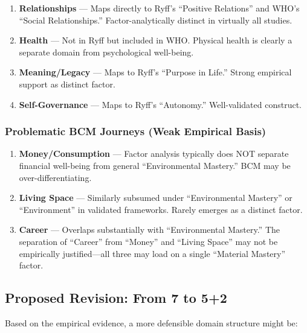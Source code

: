 \begin{enumerate}
\item \textbf{Relationships} --- Maps directly to Ryff's ``Positive Relations'' and WHO's ``Social Relationships.'' Factor-analytically distinct in virtually all studies.

\item \textbf{Health} --- Not in Ryff but included in WHO. Physical health is clearly a separate domain from psychological well-being.

\item \textbf{Meaning/Legacy} --- Maps to Ryff's ``Purpose in Life.'' Strong empirical support as distinct factor.

\item \textbf{Self-Governance} --- Maps to Ryff's ``Autonomy.'' Well-validated construct.
\end{enumerate}

\subsubsection{Problematic BCM Journeys (Weak Empirical Basis)}

\begin{enumerate}
\item \textbf{Money/Consumption} --- Factor analysis typically does NOT separate financial well-being from general ``Environmental Mastery.'' BCM may be over-differentiating.

\item \textbf{Living Space} --- Similarly subsumed under ``Environmental Mastery'' or ``Environment'' in validated frameworks. Rarely emerges as a distinct factor.

\item \textbf{Career} --- Overlaps substantially with ``Environmental Mastery.'' The separation of ``Career'' from ``Money'' and ``Living Space'' may not be empirically justified---all three may load on a single ``Material Mastery'' factor.
\end{enumerate}

\subsection{Proposed Revision: From 7 to 5+2}

Based on the empirical evidence, a more defensible domain structure might be:


